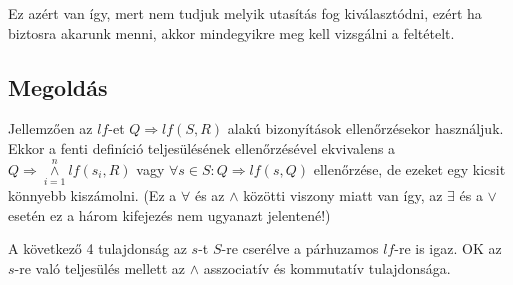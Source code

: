 \documentclass{article}
\begin{document}
Ez azért van így, mert nem tudjuk melyik utasítás fog kiválasztódni, ezért ha biztosra akarunk menni, akkor mindegyikre
meg kell vizsgálni a feltételt.
\subsection*{Megoldás}
Jellemzően az $lf$-et $Q \Rightarrow lf(S,R)$ alakú bizonyítások ellenőrzésekor használjuk. Ekkor a fenti definíció teljesülésének ellenőrzésével ekvivalens a $Q \Rightarrow \overset{n}{\underset{i=1}{\land}}lf(s_i,R)$ vagy $\forall s \in S : Q \Rightarrow lf(s,Q)$ ellenőrzése, de ezeket egy kicsit könnyebb kiszámolni. (Ez a $\forall$ és az $\land$ közötti viszony miatt van így, az $\exists$ és a $\lor$ esetén ez a három kifejezés nem ugyanazt jelentené!)

A következő 4 tulajdonság az $s$-t $S$-re cserélve a párhuzamos $lf$-re is igaz. OK az $s$-re való teljesülés mellett az $\land$ asszociatív és kommutatív tulajdonsága.
\end{document}
